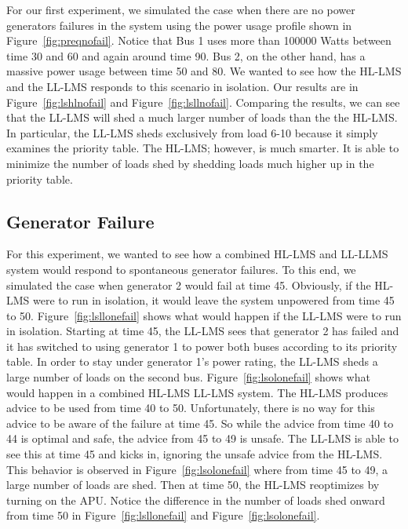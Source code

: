 \documentclass{acm_proc_article-sp}
\begin{document}
For our first experiment, we simulated the case when there are no power
generators failures in the system using the power usage profile shown in
Figure~\ref{fig:preqnofail}. Notice that Bus 1 uses more than 100000 Watts
between time 30 and 60 and again around time 90. Bus 2, on the other hand,
has a massive power usage between time 50 and 80. We wanted to see how the
HL-LMS and the LL-LMS responds to this scenario in isolation. Our results
are in Figure~\ref{fig:lshlnofail} and Figure~\ref{fig:lsllnofail}.
Comparing the results, we can see that the LL-LMS will shed a much larger
number of loads than the the HL-LMS. In particular, the LL-LMS sheds
exclusively from load 6-10 because it simply examines the priority table.
The HL-LMS; however, is much smarter. It is able to minimize the number of
loads shed by shedding loads much higher up in the priority table.

\subsection{Generator Failure}
For this experiment, we wanted to see how a combined HL-LMS and LL-LLMS
system would respond to spontaneous generator failures. To this end, we
simulated the case when generator 2 would fail at time 45. Obviously, if the HL-LMS were
to run in isolation, it would leave the system unpowered from time 45 to 50. 
Figure~\ref{fig:lsllonefail} shows what would happen if the LL-LMS were to run in 
isolation. Starting at time 45, the LL-LMS sees that generator 2 has failed and it has 
switched to using generator 1 to power both buses according to its priority table. In order
to stay under generator 1's power rating, the LL-LMS sheds a large number of loads on the 
second bus. Figure~\ref{fig:lsolonefail} shows what would happen in a combined HL-LMS
LL-LMS system. The HL-LMS produces advice to be used from time 40 to 50. Unfortunately,
there is no way for this advice to be aware of the failure at time 45. So while the advice
from time 40 to 44 is optimal and safe, the advice from 45 to 49 is unsafe. The LL-LMS is
able to see this at time 45 and kicks in, ignoring the unsafe advice from the HL-LMS. This
behavior is observed in Figure~\ref{fig:lsolonefail} where from time 45 to 49, a large
number of loads are shed. Then at time 50, the HL-LMS reoptimizes by turning on the APU.
Notice the difference in the number of loads shed onward from time 50 in 
Figure~\ref{fig:lsllonefail} and Figure~\ref{fig:lsolonefail}.
\end{document}
